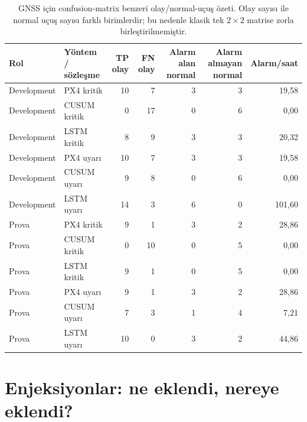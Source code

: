 \documentclass[10pt,a4paper]{article}
\begin{document}
\begin{landscape}
\small
\begin{table}[ht]
\centering
\begin{tabular}{llrrrrr}
\toprule
\textbf{Rol} & \textbf{Yöntem / sözleşme} & \textbf{TP olay} & \textbf{FN olay} &
\textbf{Alarm alan normal} & \textbf{Alarm almayan normal} & \textbf{Alarm/saat} \\
\midrule
Development & PX4 kritik & 10 & 7 & 3 & 3 & 19,58 \\
Development & CUSUM kritik & 0 & 17 & 0 & 6 & 0,00 \\
Development & LSTM kritik & 8 & 9 & 3 & 3 & 20,32 \\
Development & PX4 uyarı & 10 & 7 & 3 & 3 & 19,58 \\
Development & CUSUM uyarı & 9 & 8 & 0 & 6 & 0,00 \\
Development & LSTM uyarı & 14 & 3 & 6 & 0 & 101,60 \\
\midrule
Prova & PX4 kritik & 9 & 1 & 3 & 2 & 28,86 \\
Prova & CUSUM kritik & 0 & 10 & 0 & 5 & 0,00 \\
Prova & LSTM kritik & 9 & 1 & 0 & 5 & 0,00 \\
Prova & PX4 uyarı & 9 & 1 & 3 & 2 & 28,86 \\
Prova & CUSUM uyarı & 7 & 3 & 1 & 4 & 7,21 \\
Prova & LSTM uyarı & 10 & 0 & 3 & 2 & 44,86 \\
\bottomrule
\end{tabular}
\caption{GNSS için confusion-matrix benzeri olay/normal-uçuş özeti. Olay sayısı
ile normal uçuş sayısı farklı birimlerdir; bu nedenle klasik tek $2\times2$
matrise zorla birleştirilmemiştir.}
\end{table}
\end{landscape}

\section{Enjeksiyonlar: ne eklendi, nereye eklendi?}
\end{document}
